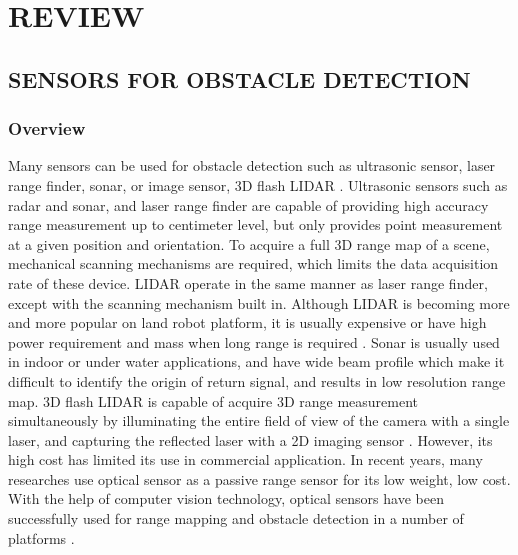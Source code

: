 \chapter{REVIEW}\label{ch:Review}

\section{SENSORS FOR OBSTACLE DETECTION}\label{sec:sensor}

\subsection{Overview}\label{sec:SensorOverview}

Many sensors can be used for obstacle detection such as ultrasonic
sensor, laser range finder, sonar, or image sensor, 3D flash LIDAR
\cite{de_angelis_low-cost_2007} \cite{alonge_novel_2009}
\cite{harb_neural_2008} \cite{saad_robust_2011}
\cite{williams_efficient_2001} \cite{chong_feature-based_1999}
\cite{hanna_obstacle_2008} \cite{lu_distance_2010}
\cite{civera_inverse_2008} \cite{jirawimut_visual_2003}
\cite{amzajerdian_lidar_2011}. Ultrasonic sensors such as radar and
sonar, and laser range finder are capable of providing high accuracy
range measurement up to centimeter level, but only provides point
measurement at a given position and orientation. To acquire a full 3D
range map of a scene, mechanical scanning mechanisms are required,
which limits the data acquisition rate of these device. LIDAR operate
in the same manner as laser range finder, except with the scanning
mechanism built in. Although LIDAR is becoming more and more popular
on land robot platform, it is usually expensive
\cite{subharsanan_low_2013} or have high power requirement and mass
when long range is required \cite{lemmens_airborne_2007}. Sonar is
usually used in indoor or under water applications, and have wide beam
profile which make it difficult to identify the origin of return
signal, and results in low resolution range map. 3D flash LIDAR is
capable of acquire 3D range measurement simultaneously by illuminating
the entire field of view of the camera with a single laser, and
capturing the reflected laser with a 2D imaging sensor
\cite{amzajerdian_lidar_2011}. However, its high cost has limited its
use in commercial application. In recent years, many researches use
optical sensor as a passive range sensor for its low weight, low cost.
With the help of computer vision technology, optical sensors have been
successfully used for range mapping and obstacle detection in a number
of platforms \cite{einhorn_cant_2010} \cite{hashimoto_detection_1996}
\cite{yamaguchi_moving_2006} \cite{zhang_obstacle_2012}
\cite{maier_self-supervised_2011} \cite{kubota_global_2007}
\cite{xu_method_2009} \cite{hanna_obstacle_2008}
\cite{zhang_real-time_2012} \cite{van_der_mark_stereo_2007}
\cite{broggi_stereo_2011}.

